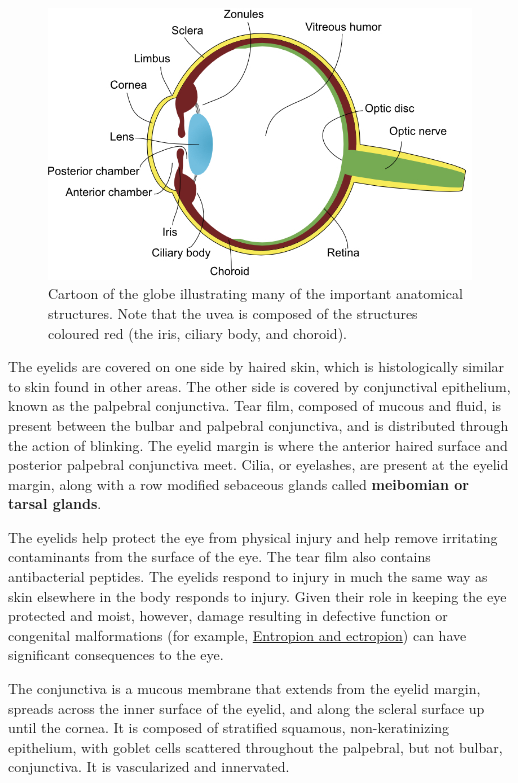 \documentclass[openany]{article}
\begin{document}
\begin{figure}

{\centering \includegraphics[width=0.6\linewidth]{images/globe-labeled} 

}

\caption{Cartoon of the globe illustrating many of the important anatomical structures. Note that the uvea is composed of the structures coloured red (the iris, ciliary body, and choroid).}\label{fig:globe}
\end{figure}

The eyelids are covered on one side by haired skin, which is
histologically similar to skin found in other areas. The other side is
covered by conjunctival epithelium, known as the palpebral conjunctiva.
Tear film, composed of mucous and fluid, is present between the bulbar
and palpebral conjunctiva, and is distributed through the action of
blinking. The eyelid margin is where the anterior haired surface and
posterior palpebral conjunctiva meet. Cilia, or eyelashes, are present
at the eyelid margin, along with a row modified sebaceous glands called
\textbf{meibomian or tarsal glands}.

The eyelids help protect the eye from physical injury and help remove
irritating contaminants from the surface of the eye. The tear film also
contains antibacterial peptides. The eyelids respond to injury in much
the same way as skin elsewhere in the body responds to injury. Given
their role in keeping the eye protected and moist, however, damage
resulting in defective function or congenital malformations (for
example, \protect\hyperlink{entropion-and-ectropion}{Entropion and
ectropion}) can have significant consequences to the eye.

The conjunctiva is a mucous membrane that extends from the eyelid
margin, spreads across the inner surface of the eyelid, and along the
scleral surface up until the cornea. It is composed of stratified
squamous, non-keratinizing epithelium, with goblet cells scattered
throughout the palpebral, but not bulbar, conjunctiva. It is
vascularized and innervated.
\end{document}
